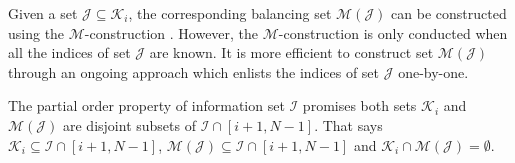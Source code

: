 \documentclass[12pt, draftclsnofoot, peerreview, onecolumn]{IEEEtran}
\theoremstyle{noparent}
\begin{document}
Given a set $\mathcal{J}\subseteq\mathcal{K}_i$, 
the corresponding balancing set $\mathcal{M}(\mathcal{J})$ can be constructed using the
$\mathcal{M}$-construction \cite{Rowshan2023FormationMinweight}. 
However, the $\mathcal{M}$-construction is only conducted when all
the indices of set $\mathcal{J}$ are known.
It is more efficient to construct set $\mathcal{M}(\mathcal{J})$ through an 
ongoing approach \cite{Rowshan2022FastEnumerationMinimum} 
which enlists the indices of set $\mathcal{J}$ one-by-one.




















































The partial order property of 
information set $\mathcal{I}$ promises both 
sets $\mathcal{K}_i$ and $\mathcal{M}(\mathcal{J})$ are 
disjoint subsets of $\mathcal{I}\cap[i+1,N-1]$.
That says $\mathcal{K}_i\subseteq \mathcal{I}\cap[i+1,N-1]$,
$\mathcal{M}(\mathcal{J})\subseteq\mathcal{I}\cap[i+1,N-1]$
and $\mathcal{K}_i\cap\mathcal{M}(\mathcal{J})=\emptyset$.
\end{document}

